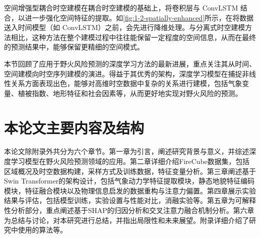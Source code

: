 空间增强型耦合时空建模在耦合时空建模的基础上，将卷积层与 ConvLSTM 结合，以进一步强化空间特征的提取。如\ref{fig:1-2-spatially-enhanced}所示，在将数据送入时间模型（如 ConvLSTM）之前，会先进行降维处理。与分离式时空建模方法相比，这种方法在整个建模过程中往往能保留一定程度的空间信息，从而在最终的预测结果中，能够保留更精细的空间模式\cite{xu2025deep,ji2024global,he2024deep}。

本节回顾了应用于野火风险预测的深度学习方法的最新进展，重点关注其从时间、空间建模向时空序列建模的演进。得益于其优秀的架构，深度学习模型在捕捉非线性关系方面表现出色，能够对高维时空数据中复杂的关系进行建模，包括气象变量、植被指数、地形特征和社会因素等，从而更好地实现对野火风险的预测。

\section{本论文主要内容及结构}
\label{sec:denotation}
本论文除附录外共分为六个章节。第一章为引言，阐述研究背景与意义，并综述深度学习模型在野火风险预测领域的应用。第二章详细介绍FireCube数据集，包括区域概况及时空数据构建，采样方式及训练数据，特征变量分析。第三章阐述基于Swin Transformer的架构设计，包括气象动力学特征提取模块，静态地貌特征编码模块，特征融合模块以及物理信息启发的数据重构与注意力偏置。第四章展示实验结果与评估，包括模型训练，实验设置与性能对比，消融实验等。第五章为可解释性分析部分，重点阐述基于SHAP的归因分析和交叉注意力融合机制分析。第六章为总结与讨论，对本研究进行总结，并指出局限性和未来展望。附录详细介绍了研究中使用的算法等。
